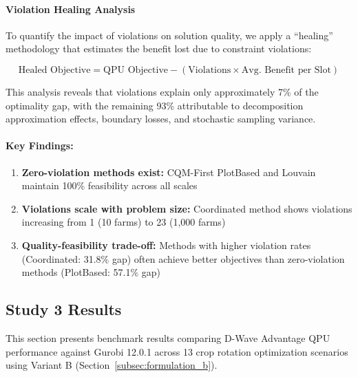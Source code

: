 \paragraph{Violation Healing Analysis}
To quantify the impact of violations on solution quality, we apply a ``healing'' methodology that estimates the benefit lost due to constraint violations:

\begin{equation}
\text{Healed Objective} = \text{QPU Objective} - (\text{Violations} \times \text{Avg. Benefit per Slot})
\end{equation}

This analysis reveals that violations explain only approximately 7\% of the optimality gap, with the remaining 93\% attributable to decomposition approximation effects, boundary losses, and stochastic sampling variance.

\paragraph{Key Findings:}
\begin{enumerate}
    \item \textbf{Zero-violation methods exist:} CQM-First PlotBased and Louvain maintain 100\% feasibility across all scales
    \item \textbf{Violations scale with problem size:} Coordinated method shows violations increasing from 1 (10 farms) to 23 (1,000 farms)
    \item \textbf{Quality-feasibility trade-off:} Methods with higher violation rates (Coordinated: 31.8\% gap) often achieve better objectives than zero-violation methods (PlotBased: 57.1\% gap)
\end{enumerate}




\subsection{Study 3 Results}
\label{subsec:quantum_advantage}

This section presents benchmark results comparing D-Wave Advantage QPU performance against Gurobi 12.0.1 across 13 crop rotation optimization scenarios using Variant B (Section~\ref{subsec:formulation_b}).


